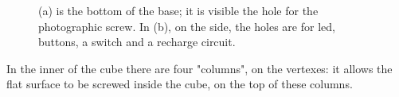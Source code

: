 \documentclass[]{article}
\begin{document}
\begin{figure}[H]
	\centering
	
	\caption[Bottom of the base]{(a) is the bottom of the base; it is visible the hole for the photographic screw. In (b), on the side, the holes are for led, buttons, a switch and a recharge circuit. }
	\label{fig:basecolumns}
\end{figure}


In the inner of the cube there are four "columns", on the vertexes: it allows the flat surface to be screwed inside the cube, on the top of these columns. 
\end{document}

